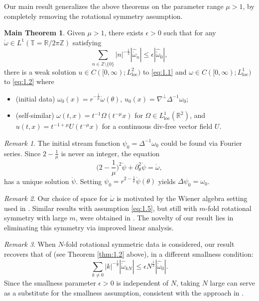 \documentclass[11pt]{article}
\theoremstyle{definition}
\newtheorem*{mainthm}{Main Theorem}
\theoremstyle{remark}
\numberwithin{equation}{section}
\newcommand{\mbb}{\mathbb}
\renewcommand{\hat}{\widehat}
\newcommand{\Z}{\mbb{Z}}
\newcommand{\R}{\mbb{R}}
\newcommand{\del}{\partial}
\newcommand{\grad}{\nabla}
\begin{document}
Our main result generalizes the above theorems on the parameter range $\mu > 1$, by completely removing the rotational symmetry assumption.

\begin{mainthm}
Given $\mu > 1$, there exists $\epsilon > 0$ such that for any $\mathring{\omega}\in L^1(\mbb{T} = \R/2\pi\Z)$ satisfying
\begin{equation} \label{eq:1.5}
\sum_{n\in \Z\setminus\{0\}} |n|^{-\frac{1}{2}} |\hat{\mathring{\omega}}_n| \leq \epsilon |\hat{\mathring{\omega}}_0|,
\end{equation}
there is a weak solution $u\in C([0,\infty);L^2_{\text{loc}})$ to \eqref{eq:1.1} and $\omega\in C([0,\infty); L^1_{\text{loc}})$ to \eqref{eq:1.2} where
\vspace{-.5em}\begin{itemize}
	\item (initial data) $\omega_0(x) = r^{-\frac{1}{\mu}} \mathring{\omega}(\theta)$, $u_0(x) = \grad^\perp \Delta^{-1} \omega_0$;
	\item (self-similar) $\omega(t,x) = t^{-1} \Omega(t^{-\mu} x)$ for $\Omega\in L^1_{\text{loc}}(\R^2)$, and $u(t,x) = t^{-1+\mu} U(t^{-\mu} x)$ for a continuous div-free vector field $U$.
\end{itemize}
\end{mainthm}
\noindent\textit{Remark 1}. The initial stream function $\psi_0 = \Delta^{-1} \omega_0$ could be found via Fourier series. Since $2 - \frac{1}{\mu}$ is never an integer, the equation
\[\Big(2 - \frac{1}{\mu}\Big)^2 \mathring{\psi} + \del_\theta^2 \mathring{\psi} = \mathring{\omega},\]
has a unique solution $\mathring{\psi}$. Setting $\psi_0 = r^{2 - \frac{1}{\mu}} \mathring{\psi}(\theta)$ yields $\Delta \psi_0 = \omega_0$.

\noindent\textit{Remark 2}. Our choice of space for $\mathring{\omega}$ is motivated by the Wiener algebra setting used in \cite{Ell16}. Similar results with assumption \eqref{eq:1.5}, but still with $m$-fold rotational symmetry with large $m$, were obtained in \cite{J23pre}. The novelty of our result lies in eliminating this symmetry via improved linear analysis.

\noindent\textit{Remark 3}. When $N$-fold rotational symmetric data is considered, our result recovers that of \cite{SWZ25} (see Theorem \ref{thm:1.2} above), in a different smallness condition:
\[\sum_{k\neq 0} |k|^{-\frac{1}{2}} |\hat{\mathring{\omega}}_{kN}| \leq \epsilon N^{\frac{1}{2}} |\hat{\mathring{\omega}}_0|.\]
Since the smallness parameter $\epsilon > 0$ is independent of $N$, taking $N$ large can serve as a substitute for the smallness assumption, consistent with the approach in \cite{Ell16}.
\end{document}

